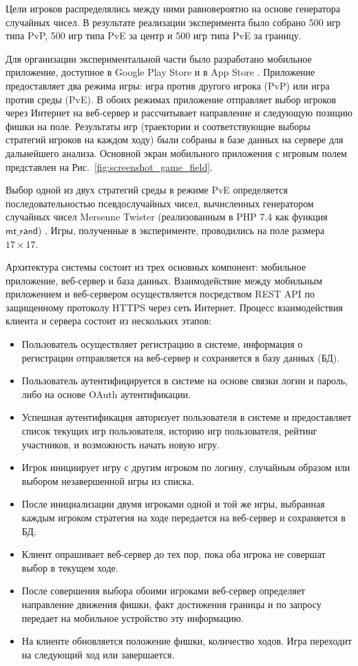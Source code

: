 Цели игроков распределялись между ними равновероятно на основе генератора случайных чисел. В результате реализации эксперимента было собрано 500 игр типа PvP, 500 игр типа PvE за центр и 500 игр типа PvE за границу.

Для организации экспериментальной части было разработано мобильное приложение, доступное в Google Play Store \cite{googleplay} и в App Store \cite{applestore}. Приложение предоставляет два режима игры: игра против другого игрока (PvP) или игра против среды (PvE). В обоих режимах приложение отправляет выбор игроков через Интернет на веб-сервер и рассчитывает направление и следующую позицию фишки на поле. Результаты игр (траектории и соответствующие выборы стратегий игроков на каждом ходу) были собраны в базе данных на сервере для дальнейшего анализа. Основной экран мобильного приложения с игровым полем представлен на Рис.~\cref{fig:screenshot_game_field}.

Выбор одной из двух стратегий среды в режиме PvE определяется последовательностью псевдослучайных чисел, вычисленных генератором случайных чисел Mersenne Twister (реализованным в PHP 7.4 как функция $\mathsf{mt\_rand}$) \cite{matsumoto_mersenne_1998}. Игры, полученные в эксперименте, проводились на поле размера $17 \times 17$.

Архитектура системы состоит из трех основных компонент: мобильное приложение, веб-сервер и база данных. Взаимодействие между мобильным приложением и веб-сервером осуществляется посредством REST API по защищенному протоколу HTTPS через сеть Интернет. Процесс взаимодействия клиента и сервера состоит из нескольких этапов:
\begin{itemize}
\item Пользователь осуществляет регистрацию в системе, информация о регистрации отправляется на веб-сервер и сохраняется в базу данных (БД).
\item Пользователь аутентифицируется в системе на основе связки логин и пароль, либо на основе OAuth аутентификации.
\item Успешная аутентификация авторизует пользователя в системе и предоставляет список текущих игр пользователя, историю игр пользователя, рейтинг участников, и возможность начать новую игру.
\item Игрок инициирует игру с другим игроком по логину, случайным образом или выбором незавершенной игры из списка.
\item После инициализации двумя игроками одной и той же игры, выбранная каждым игроком стратегия на ходе передается на веб-сервер и сохраняется в БД.
\item Клиент опрашивает веб-сервер до тех пор, пока оба игрока не совершат выбор в текущем ходе.
\item После совершения выбора обоими игроками веб-сервер определяет направление движения фишки, факт достижения границы и по запросу передает на мобильное устройство эту информацию.
\item На клиенте обновляется положение фишки, количество ходов. Игра переходит на следующий ход или завершается.
\end{itemize}

